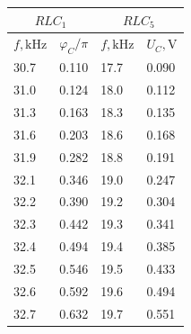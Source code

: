 \documentclass[12pt, a4paper]{article}
\begin{document}
\begin{minipage}{0.45\linewidth}
  \begin{table}[H]
    \begin{tabular}{|ll|ll|}
      \hline
      \multicolumn{2}{|c|}{$RLC_1$}                               & \multicolumn{2}{c|}{$RLC_5$}                                 \\ \hline
      \multicolumn{1}{|l|}{$f, \mathrm{kHz}$} & $\varphi_C/\pi$ & \multicolumn{1}{l|}{$f, \mathrm{kHz}$} & $U_C, \mathrm{V}$ \\ \hline
      \multicolumn{1}{|l|}{30.7}              & 0.110           & \multicolumn{1}{l|}{17.7}              & 0.090             \\ \hline
      \multicolumn{1}{|l|}{31.0}              & 0.124           & \multicolumn{1}{l|}{18.0}              & 0.112             \\ \hline
      \multicolumn{1}{|l|}{31.3}              & 0.163           & \multicolumn{1}{l|}{18.3}              & 0.135             \\ \hline
      \multicolumn{1}{|l|}{31.6}              & 0.203           & \multicolumn{1}{l|}{18.6}              & 0.168             \\ \hline
      \multicolumn{1}{|l|}{31.9}              & 0.282           & \multicolumn{1}{l|}{18.8}              & 0.191             \\ \hline
      \multicolumn{1}{|l|}{32.1}              & 0.346           & \multicolumn{1}{l|}{19.0}              & 0.247             \\ \hline
      \multicolumn{1}{|l|}{32.2}              & 0.390           & \multicolumn{1}{l|}{19.2}              & 0.304             \\ \hline
      \multicolumn{1}{|l|}{32.3}              & 0.442           & \multicolumn{1}{l|}{19.3}              & 0.341             \\ \hline
      \multicolumn{1}{|l|}{32.4}              & 0.494           & \multicolumn{1}{l|}{19.4}              & 0.385             \\ \hline
      \multicolumn{1}{|l|}{32.5}              & 0.546           & \multicolumn{1}{l|}{19.5}              & 0.433             \\ \hline
      \multicolumn{1}{|l|}{32.6}              & 0.592           & \multicolumn{1}{l|}{19.6}              & 0.494             \\ \hline
      \multicolumn{1}{|l|}{32.7}              & 0.632           & \multicolumn{1}{l|}{19.7}              & 0.551             \\ \hline

\end{tabular}
\end{table}
\end{minipage}
\end{document}
